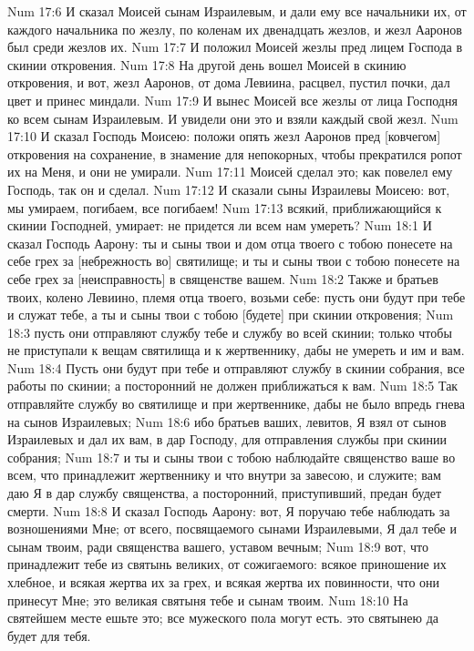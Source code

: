 Num 17:6  И сказал Моисей сынам Израилевым, и дали ему все начальники их, от каждого начальника по жезлу, по коленам их двенадцать жезлов, и жезл Ааронов был среди жезлов их.
Num 17:7  И положил Моисей жезлы пред лицем Господа в скинии откровения.
Num 17:8  На другой день вошел Моисей в скинию откровения, и вот, жезл Ааронов, от дома Левиина, расцвел, пустил почки, дал цвет и принес миндали.
Num 17:9  И вынес Моисей все жезлы от лица Господня ко всем сынам Израилевым. И увидели они это и взяли каждый свой жезл.
Num 17:10  И сказал Господь Моисею: положи опять жезл Ааронов пред [ковчегом] откровения на сохранение, в знамение для непокорных, чтобы прекратился ропот их на Меня, и они не умирали.
Num 17:11  Моисей сделал это; как повелел ему Господь, так он и сделал.
Num 17:12  И сказали сыны Израилевы Моисею: вот, мы умираем, погибаем, все погибаем!
Num 17:13  всякий, приближающийся к скинии Господней, умирает: не придется ли всем нам умереть?
Num 18:1  И сказал Господь Аарону: ты и сыны твои и дом отца твоего с тобою понесете на себе грех за [небрежность во] святилище; и ты и сыны твои с тобою понесете на себе грех за [неисправность] в священстве вашем.
Num 18:2  Также и братьев твоих, колено Левиино, племя отца твоего, возьми себе: пусть они будут при тебе и служат тебе, а ты и сыны твои с тобою [будете] при скинии откровения;
Num 18:3  пусть они отправляют службу тебе и службу во всей скинии; только чтобы не приступали к вещам святилища и к жертвеннику, дабы не умереть и им и вам.
Num 18:4  Пусть они будут при тебе и отправляют службу в скинии собрания, все работы по скинии; а посторонний не должен приближаться к вам.
Num 18:5  Так отправляйте службу во святилище и при жертвеннике, дабы не было впредь гнева на сынов Израилевых;
Num 18:6  ибо братьев ваших, левитов, Я взял от сынов Израилевых и дал их вам, в дар Господу, для отправления службы при скинии собрания;
Num 18:7  и ты и сыны твои с тобою наблюдайте священство ваше во всем, что принадлежит жертвеннику и что внутри за завесою, и служите; вам даю Я в дар службу священства, а посторонний, приступивший, предан будет смерти.
Num 18:8  И сказал Господь Аарону: вот, Я поручаю тебе наблюдать за возношениями Мне; от всего, посвящаемого сынами Израилевыми, Я дал тебе и сынам твоим, ради священства вашего, уставом вечным;
Num 18:9  вот, что принадлежит тебе из святынь великих, от сожигаемого: всякое приношение их хлебное, и всякая жертва их за грех, и всякая жертва их повинности, что они принесут Мне; это великая святыня тебе и сынам твоим.
Num 18:10  На святейшем месте ешьте это; все мужеского пола могут есть. это святынею да будет для тебя.
